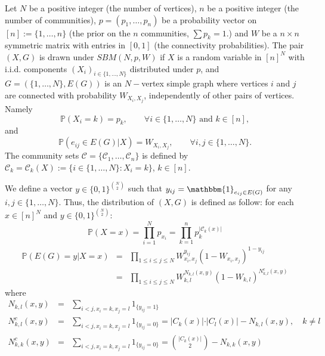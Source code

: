 \begin{definition}
Let $N$ be a positive integer (the number of vertices), $n$ be a positive integer (the number of communities), $p = (p_1,\ldots, p_n)$ be a probability vector on $[n] :=\{1,\ldots, n\}$ (the prior on the $n$ communities, $\sum p_k = 1$.) and $W$ be a $n \times n$ symmetric matrix with entries in $[0,1]$ (the connectivity probabilities).  The pair $(X,G)$ is drawn under $SBM(N,p,W)$ if $X$ is a random variable in $[n]^N$ with i.i.d. components $(X_i)_{i \in \{1,\ldots,N\}}$ distributed under $p$, and $G = (\{1,\ldots,N\}, E(G))$ is an $N-$vertex simple graph where vertices $i$ and $j$ are connected with probability $W_{X_i, X_j}$, independently of other pairs of vertices. Namely
$$
	\mathbb{P}(X_i = k) = p_k,\qquad \forall i \in \{1,\ldots, N\} \text{ and } k \in [n],
$$
and
$$
	\mathbb{P}( e_{ij} \in E(G) | X) = W_{X_i,X_j}, \qquad \forall i,j \in \{1,\ldots,N\}.
$$
The community sets $\mathcal{C} = \{ \mathcal{C}_1, \ldots, \mathcal{C}_n \}$ is defined by $\mathcal{C}_k = \mathcal{C}_k(X) := \{i \in \{1,\ldots,N\} : X_i = k \}$, $k \in [n]$.
\end{definition}


We define a vector $ y \in \{0,1\}^{\binom{N}{2}}$ such that $y_{ij} = \mathbbm{1}_{e_{ij} \in E(G)}$ for any $i,j \in \{1,\ldots,N\}$. Thus, the distribution of $(X,G)$ is defined as follow:
for each $x \in [n]^N$ and $ y \in \{0,1\}^{\binom{N}{2}}$:
\begin{equation}
 \mathbb{P}(X = x) = \prod_{i=1}^N p_{x_i} = \prod_{k=1}^n p_k^{| \mathcal{C}_k(x) |}
\end{equation}
\begin{eqnarray}
\mathbb{P}(E(G)= y | X=x) &=& \prod_{1\leq i\leq j \leq N} W_{x_i,x_j}^{y_{ij}} (1- W_{x_i, x_j})^{1- y_{ij}} \\
&=& \prod_{1\leq i\leq j \leq N} W_{k,l}^{N_{k,l}(x,y)} (1- W_{k,l})^{N^c_{k,l}(x,y)}
\end{eqnarray}
where
\begin{eqnarray}
	N_{k,l}(x,y) &=& \sum_{i<j, x_i = k, x_j = l} {1}_{\{y_{ij} =1 \} }\\
	N_{k,l}^c(x,y) &=& \sum_{i<j, x_i =k, x_j = l} {1}_{\{y_{ij} = 0 \}} = \vert C_k(x) \vert \cdot \vert C_l(x) \vert - N_{k,l}(x,y) , \quad k \neq l \\
	N_{k,k}^c(x,y) &=& \sum_{i<j, x_i = k, x_j = l} {1}_{\{ y_{ij} = 0 \}} = \binom{\vert C_k(x) \vert }{2} - N_{k,k}(x,y)
\end{eqnarray}



